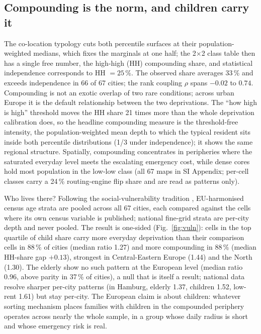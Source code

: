 \documentclass[9pt,twocolumn]{article}
\begin{document}
\subsection*{Compounding is the norm, and children carry it}

The co-location typology cuts both percentile surfaces at their
population-weighted medians, which fixes the marginals at one half; the
2$\times$2 class table then has a single free number, the high-high (HH)
compounding share, and statistical independence corresponds to
HH $= 25\,\%$. The observed share averages 33\,\% and exceeds independence
in 66 of 67 cities; the rank coupling $\rho$ spans $-0.02$ to $0.74$.
Compounding is not an exotic overlap of two rare conditions; across urban
Europe it is the default relationship between the two deprivations. The
``how high is high'' threshold moves the HH share 21 times more than the
whole deprivation calibration does, so the headline compounding measure
is the threshold-free intensity, the population-weighted mean depth to
which the typical resident sits inside both percentile distributions
(1/3 under independence); it shows the same regional structure. Spatially,
compounding concentrates in peripheries where the saturated everyday
level meets the escalating emergency cost, while dense cores hold most
population in the low-low class (all 67 maps in SI Appendix; per-cell
classes carry a 24\,\% routing-engine flip share and are read as patterns
only).

Who lives there? Following the social-vulnerability tradition
\citep{cutter2003vulnerability}, EU-harmonised census age strata are
pooled across all 67 cities, each compared against the cells where its
own census variable is published; national fine-grid strata are per-city
depth and never pooled. The result is one-sided (Fig.~\ref{fig:vuln}):
cells in the top quartile of child share carry more everyday deprivation
than their comparison cells in 88\,\% of cities (median ratio 1.27) and
more compounding in 88\,\% (median HH-share gap $+0.13$), strongest in
Central-Eastern Europe (1.44) and the North (1.30). The elderly show no
such pattern at the European level (median ratio 0.96, above parity in
37\,\% of cities), a null that is itself a result; national data resolve
sharper per-city patterns (in Hamburg, elderly 1.37, children 1.52,
low-rent 1.61) but stay per-city. The European claim is about children:
whatever sorting mechanism places families with children in the
compounded periphery operates across nearly the whole sample, in a group
whose daily radius is short and whose emergency risk is real.
\end{document}
